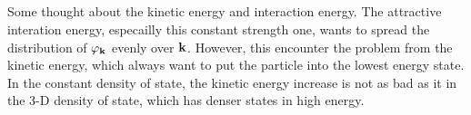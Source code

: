 \subsection{}
Some thought about the kinetic energy and interaction energy.  The attractive interation energy, especailly this constant strength one, wants to spread the distribution of $\varphi_{\mathbf{k}}$ evenly over $\mathbf{k}$.  However, this encounter the problem from the kinetic energy, which always want to put the particle into the lowest energy state.  In the constant density of state, the kinetic energy increase is not as bad as it in the 3-D density of state, which has denser states in high energy. 